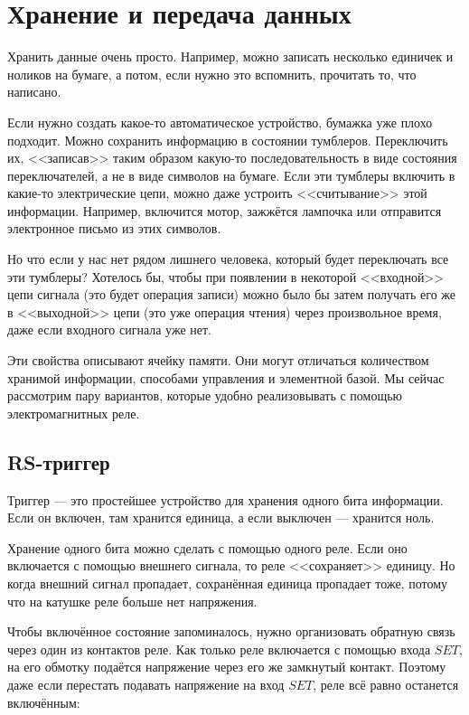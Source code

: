 \chapter{Хранение и передача данных}

Хранить данные очень просто. Например, можно записать несколько единичек
и ноликов на бумаге, а потом, если нужно это вспомнить, прочитать то, что написано.

Если нужно создать какое-то автоматическое устройство, бумажка уже плохо
подходит. Можно сохранить информацию в состоянии тумблеров. Переключить
их, <<записав>> таким образом какую-то последовательность в виде
состояния переключателей, а не в виде символов на бумаге. Если эти тумблеры
включить в какие-то электрические цепи, можно даже устроить <<считывание>>
этой информации. Например, включится мотор, зажжётся лампочка или
отправится электронное письмо из этих символов.

Но что если у нас нет рядом лишнего человека, который будет переключать
все эти тумблеры? Хотелось бы, чтобы при появлении в некоторой <<входной>>
цепи сигнала (это будет операция записи) можно было бы затем получать его же
в <<выходной>> цепи (это уже операция чтения) через произвольное время,
даже если входного сигнала уже нет.

Эти свойства описывают ячейку памяти. Они могут отличаться количеством
хранимой информации, способами управления и элементной базой.
Мы сейчас рассмотрим пару вариантов, которые удобно реализовывать
с помощью электромагнитных реле.

\section{RS-триггер}

Триггер --- это простейшее устройство для хранения одного бита информации.
Если он включен, там хранится единица, а если выключен --- хранится ноль.

Хранение одного бита можно сделать с помощью одного реле.
Если оно включается с помощью внешнего сигнала, то реле <<сохраняет>> единицу.
Но когда внешний сигнал пропадает, сохранённая единица пропадает тоже,
потому что на катушке реле больше нет напряжения.

Чтобы включённое состояние запоминалось, нужно организовать обратную
связь через один из контактов реле. Как только реле включается с помощью
входа $SET$, на его
обмотку подаётся напряжение через его же замкнутый контакт. Поэтому даже
если перестать подавать напряжение на вход $SET$, реле всё равно останется включённым:

